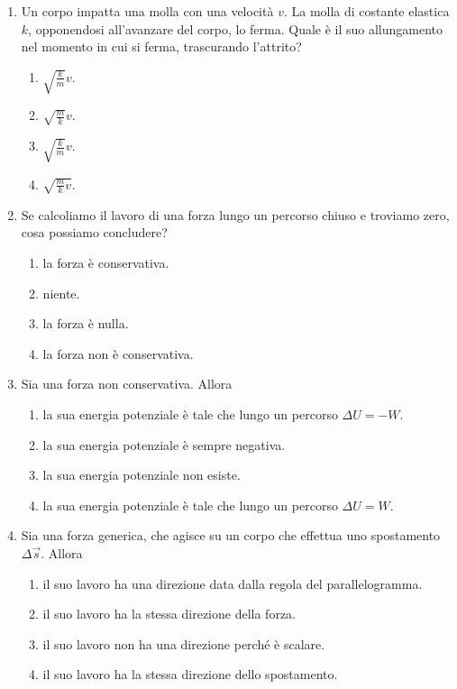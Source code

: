 \documentclass{article}
\begin{document}
\begin{enumerate}
  \item Un corpo impatta una molla con una velocità $v$. La molla di costante elastica $k$, opponendosi all'avanzare del corpo, lo ferma. Quale è il suo allungamento nel momento in cui si ferma, trascurando l'attrito?
  \begin{enumerate}[label=\Alph*.]
    \item $\sqrt{\frac{k}{m}}v$.
    \item $\sqrt{\frac{m}{k}}v$.
    \item $\sqrt{\frac{k}{m}}v$.
    \item $\sqrt{\frac{m}{k}v}$.
  \end{enumerate}
  \item Se calcoliamo il lavoro di una forza lungo un percorso chiuso e troviamo zero, cosa possiamo concludere?
  \begin{enumerate}[label=\Alph*.]
    \item la forza è conservativa.
    \item niente.
    \item la forza è nulla.
    \item la forza non è conservativa.
  \end{enumerate}
  \item Sia  una forza non conservativa. Allora
  \begin{enumerate}[label=\Alph*.]
    \item la sua energia potenziale è tale che lungo un percorso $\Delta U=-W$.
    \item la sua energia potenziale è sempre negativa.
    \item la sua energia potenziale non esiste.
    \item la sua energia potenziale è tale che lungo un percorso $\Delta U=W$.
  \end{enumerate}
  \item Sia  una forza generica, che agisce su un corpo che effettua uno spostamento $\Delta \vec{s}$. Allora
  \begin{enumerate}[label=\Alph*.]
    \item il suo lavoro ha una direzione data dalla regola del parallelogramma.
    \item il suo lavoro ha la stessa direzione della forza.
    \item il suo lavoro non ha una direzione perché è scalare.
    \item il suo lavoro ha la stessa direzione dello spostamento.

\end{enumerate}
\end{enumerate}
\end{document}
